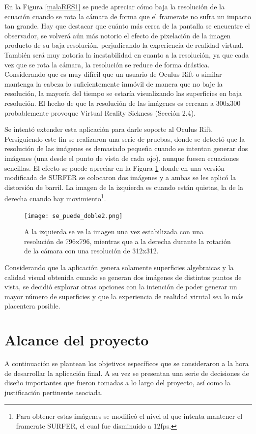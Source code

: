 \documentclass[12pt]{article}
\begin{document}
En la Figura \ref{malaRES1} se puede apreciar cómo baja la resolución de la ecuación cuando se rota la cámara de forma  que el framerate no sufra un impacto tan grande. Hay que destacar que cuánto más cerca de la pantalla se encuentre el observador, se volverá aún más notorio el efecto de pixelación de la imagen producto de su baja resolución, perjudicando la experiencia de realidad virtual. También será muy notoria la inestabilidad en cuanto a la resolución, ya que cada vez que se rota la cámara, la resolución se reduce de forma drástica. Considerando que es muy difícil que un  usuario de Oculus Rift o similar mantenga la cabeza lo suficientemente inmóvil de manera que no baje la resolución, la mayoría del tiempo se estaría visualizando las superficies en baja resolución. El hecho de que la resolución de las imágenes es cercana a 300x300 probablemente provoque Virtual Reality Sickness (Sección 2.4).

Se intentó extender esta aplicación para darle soporte al Oculus Rift. Persiguiendo este fin se realizaron una serie de pruebas, donde se detectó que la resolución de las imágenes es demasiado pequeña cuando se intentan generar dos imágenes (una desde el punto de vista de cada ojo), aunque fuesen ecuaciones sencillas. El efecto se puede apreciar en la Figura \ref{malaRES2} donde en una versión modificada de SURFER se colocaron dos imágenes y a ambas se les aplicó la distorsión de barril. La imagen de la izquierda es cuando están quietas, la de la derecha cuando hay movimiento\footnote{Para obtener estas imágenes se modificó el nivel al que intenta mantener el framerate SURFER, el cual fue disminuido a 12fps.}.
\clearpage
\begin{figure}[h!]
\texttt{[image: se\_puede\_doble2.png]}
\caption{A la izquierda se ve la imagen una vez estabilizada con una resolución de 796x796, mientras que a la derecha durante la rotación de la cámara con una resolución de 312x312.}
\label{malaRES2}
\end{figure}
Considerando que la aplicación genera solamente superficies algebraicas y la calidad visual obtenida cuando se generan dos imágenes de distintos puntos de vista, se decidió explorar otras opciones con la intención de poder generar un mayor número de superficies y que la experiencia de realidad virutal sea lo más placentera posible.
\clearpage
\section{Alcance del proyecto}
A continuación se plantean los objetivos específicos que se consideraron a la hora de desarrollar la aplicación final. A su vez se presentan una serie de decisiones de diseño importantes que fueron tomadas a lo largo del proyecto, así como la justificación pertinente asociada.
\end{document}
